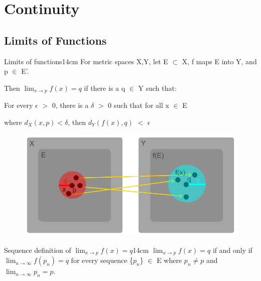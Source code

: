 \newpage

\section[Day 11: Continuity]{ Continuity }

\subsection{ Limits of Functions }

    \begin{definition}{Limits of functions}{14cm}
        For metric spaces X,Y, let E $\subset$ X, f maps E into Y,
        and p $\in$ E'.
        
        Then $\lim_{x \rightarrow p} f(x) = q$
        if there is a q $\in$ Y such that:
        
        \begin{adjustbox}{minipage=13cm, right, vspace=0.1cm 0cm}
            For every $\epsilon$ $>$ 0, there is a $\delta$ $>$ 0
            such that for all x $\in$ E
            
            where $d_X(x,p) < \delta$, then
            $d_Y(f(x),q)$ $<$ $\epsilon$
        \end{adjustbox}
    \end{definition}



    \begin{figure}[h]
        \centering
        \includegraphics[scale=0.45]{Images/11.1.1.png}
    \end{figure}



    \begin{wtheorem}{Sequence definition of $\lim_{x \rightarrow p} f(x) = q$}{14cm}
        $\lim_{x \rightarrow p} f(x) = q$ if and only if
        $\lim_{n \rightarrow \infty} f(p_n) = q$ for every
        sequence \{$p_n$\} $\in$ E where $p_n \not = p$ and
        $\lim_{n \rightarrow \infty} p_n = p$.
    \end{wtheorem}

